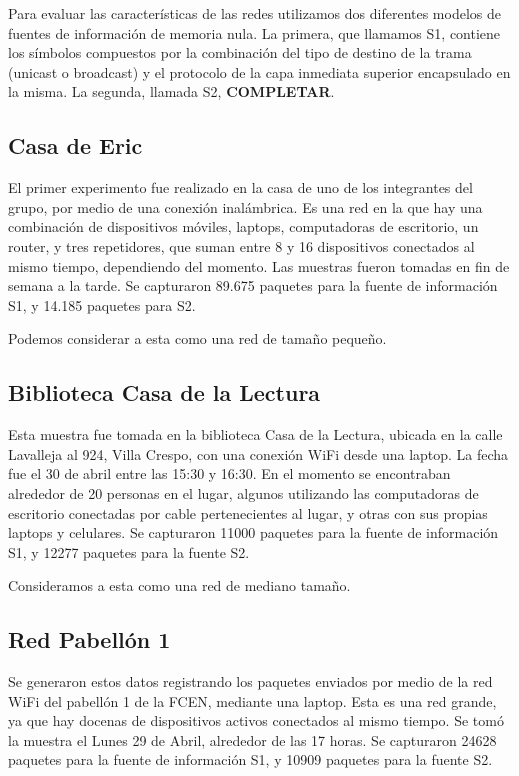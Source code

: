 
Para evaluar las características de las redes utilizamos dos diferentes modelos
de fuentes de información de memoria nula. La primera, que llamamos S1, contiene
los símbolos compuestos por la combinación del tipo de destino de la trama
(unicast o broadcast) y el protocolo de la capa inmediata superior encapsulado
en la misma. La segunda, llamada S2, \textbf{COMPLETAR}.

\subsection{Casa de Eric}
El primer experimento fue realizado en la casa de uno de los integrantes del grupo, por
medio de una conexión inalámbrica. Es una red en la que hay una combinación de dispositivos
móviles, laptops, computadoras de escritorio, un router, y tres repetidores, 
que suman entre 8 y 16 dispositivos conectados al mismo tiempo, dependiendo del momento.
Las muestras fueron tomadas en fin de semana a la tarde. 
Se capturaron 89.675 paquetes
para la fuente de información S1, y 14.185 paquetes para S2.

Podemos considerar a esta como una red de tamaño pequeño.

\subsection{Biblioteca Casa de la Lectura}
Esta muestra fue tomada en la biblioteca Casa de la Lectura, ubicada en
la calle Lavalleja al 924, Villa Crespo, con una conexión WiFi desde una laptop.
La fecha fue el 30 de abril entre las
15:30 y 16:30. En el momento se encontraban alrededor de 20 personas en el lugar,
algunos utilizando las computadoras de escritorio conectadas por cable
pertenecientes al lugar, y otras con sus propias laptops y celulares. 
Se capturaron 11000 paquetes para la fuente de información S1, 
y 12277 paquetes para la fuente S2.

Consideramos a esta como una red de mediano tamaño.

\subsection{Red Pabellón 1}
Se generaron estos datos registrando los paquetes enviados por medio de 
la red WiFi del pabellón 1 de la FCEN, mediante una laptop. Esta es una 
red grande, ya que hay docenas de dispositivos activos conectados al mismo
tiempo. Se tomó la muestra el Lunes 29 de Abril, alrededor de las 17 horas.
Se capturaron 24628 paquetes para la fuente de información S1, y 10909
paquetes para la fuente S2.
